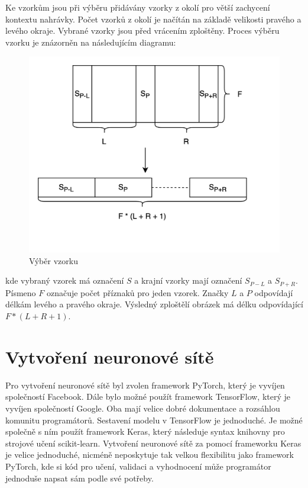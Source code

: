 \documentclass[FM,BP]{tulthesis}
\begin{document}
Ke vzorkům jsou při výběru přidávány vzorky z okolí pro větší zachycení kontextu nahrávky. Počet vzorků z okolí je načítán na základě velikosti pravého a levého okraje. Vybrané vzorky jsou před vrácením zploštěny. Proces výběru vzorku je znázorněn na následujícím diagramu:

\begin{figure}[htbp]
\centerline{\includegraphics[scale=.15]{sample_selection.png}}
\caption{Výběr vzorku}
\label{fig}
\end{figure}

kde vybraný vzorek má označení $ S $ a krajní vzorky mají označení $ S_{P-L} $ a $ S_{P+R} $. Písmeno $ F $ označuje počet příznaků pro jeden vzorek. Značky $ L $ a $ P $ odpovídají délkám levého a pravého okraje. Výsledný zploštělí obrázek má délku odpovídající $ F * (L + R + 1) $.

\section{Vytvoření neuronové sítě}
Pro vytvoření neuronové sítě byl zvolen framework PyTorch, který je vyvíjen společností Facebook. Dále bylo možné použít framework TensorFlow, který je vyvíjen společností Google. Oba mají velice dobré dokumentace a rozsáhlou komunitu programátorů. Sestavení modelu v TensorFlow je jednoduché. Je možné společně s ním použít framework Keras, který následuje syntax knihovny pro strojové učení scikit-learn. Vytvoření neuronové sítě za pomocí frameworku Keras je velice jednoduché, nicméně neposkytuje tak velkou flexibilitu jako framework PyTorch, kde si kód pro učení, validaci a vyhodnocení může programátor jednoduše napsat sám podle své potřeby. 
\end{document}
